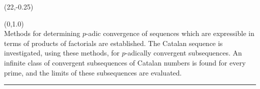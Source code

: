 \documentclass[a0]{a0poster}
\theoremstyle{definition}
\def\LHead#1{\noindent{\bf \LARGE\color{DarkBlue} #1}\smallskip}
\begin{document}
\begin{textblock}{2}(22,-0.25)
\end{textblock}
\begin{textblock}{7}(0,1.0)
  \LHead{Abstract}\\
 Methods for determining $p$-adic convergence of sequences which are expressible in terms of products of factorials are established. The Catalan sequence is investigated, using these methods, for $p$-adically convergent subsequences. An infinite class of convergent subsequences of Catalan numbers is found for every prime, and the limits of these subsequences are evaluated.
  \medskip
  \hrule
\end{textblock}
\end{document}
